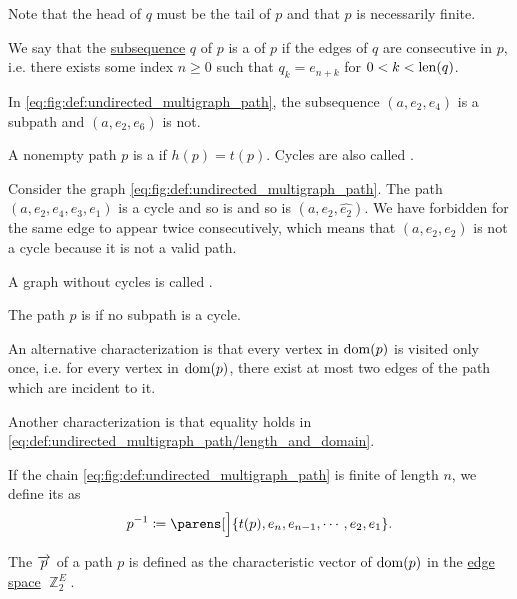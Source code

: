 \begin{definition}
\begin{thmenum}
    Note that the head of \( q \) must be the tail of \( p \) and that \( p \) is necessarily finite.

     We say that the \hyperref[def:sequence]{subsequence} \( q \) of \( p \) is a  of \( p \) if the edges of \( q \) are consecutive in \( p \), i.e. there exists some index \( n \geq 0 \) such that \( q_k = e_{n + k} \) for \( 0 < k < \operatorname{len}(q) \).

    In \eqref{eq:fig:def:undirected_multigraph_path}, the subsequence \( (a, e_2, e_4) \) is a subpath and \( (a, e_2, e_6) \) is not.

     A nonempty path \( p \) is a  if \( h(p) = t(p) \). Cycles are also called .

    Consider the graph \eqref{eq:fig:def:undirected_multigraph_path}. The path \( (a, e_2, e_4, e_3, e_1) \) is a cycle and so is and so is \( (a, e_2, \widehat{e_2}) \). We have forbidden for the same edge to appear twice consecutively, which means that \( (a, e_2, e_2) \) is not a cycle because it is not a valid path.

    A graph without cycles is called .

     The path \( p \) is  if no subpath is a cycle.

    An alternative characterization is that every vertex in \( \operatorname{dom}(p) \) is visited only once, i.e. for every vertex in \( \operatorname{dom}(p) \), there exist at most two edges of the path which are incident to it.

    Another characterization is that equality holds in \eqref{eq:def:undirected_multigraph_path/length_and_domain}.

     If the chain \eqref{eq:fig:def:undirected_multigraph_path} is finite of length \( n \), we define its  as
    \begin{equation*}
      p^{-1} \coloneqq \parens[\Big]{ t(p), e_n, e_{n-1}, \cdots, e_2, e_1 }.
    \end{equation*}

     The  \( \overrightarrow{p} \) of a path \( p \) is defined as the characteristic vector of \( \operatorname{dom}(p) \) in the \hyperref[def:hypergraph_vector_spaces/edge]{edge space} \( \BbbZ_2^E \).
  \end{thmenum}
\end{definition}

